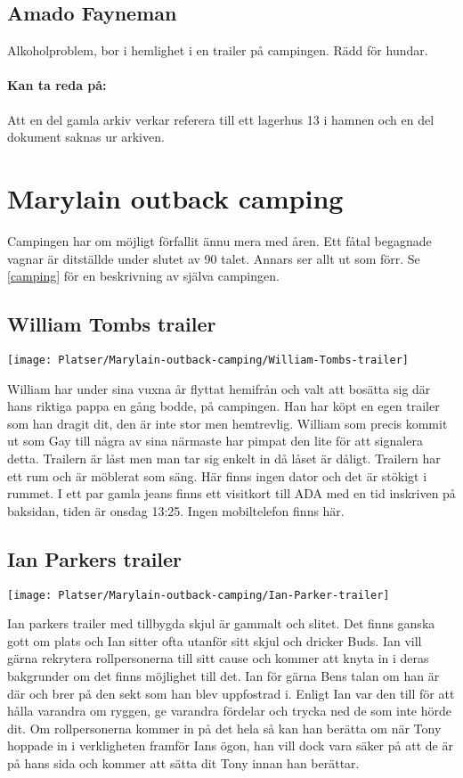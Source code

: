 \documentclass[a5paper,10pt]{report}
\begin{document}
\subsection{Amado Fayneman}
Alkoholproblem, bor i hemlighet i en trailer på campingen. Rädd för hundar.
\paragraph{Kan ta reda på:} Att en del gamla arkiv verkar referera till ett lagerhus 13 i hamnen och en del dokument saknas ur arkiven.
\clearpage
\section{Marylain outback camping}
Campingen har om möjligt förfallit ännu mera med åren. Ett fåtal begagnade vagnar är ditställde under slutet av 90 talet. Annars ser allt ut som förr. Se \ref{camping} för en beskrivning av själva campingen.
\subsection{William Tombs trailer}
\texttt{[image: Platser/Marylain-outback-camping/William-Tombs-trailer]}

William har under sina vuxna år flyttat hemifrån och valt att bosätta sig där hans riktiga pappa en gång bodde, på campingen. Han har köpt en egen trailer som han dragit dit, den är inte stor men hemtrevlig. William som precis kommit ut som Gay till några av sina närmaste har pimpat den lite för att signalera detta. Trailern är låst men man tar sig enkelt in då låset är dåligt. Trailern har ett rum och är möblerat som säng. Här finns ingen dator och det är stökigt i rummet. I ett par gamla jeans finns ett visitkort till ADA med en tid inskriven på baksidan, tiden är onsdag 13:25. Ingen mobiltelefon finns här.
\clearpage
\subsection{Ian Parkers trailer}
\texttt{[image: Platser/Marylain-outback-camping/Ian-Parker-trailer]}

Ian parkers trailer med tillbygda skjul är gammalt och slitet. Det finns ganska gott om plats och Ian sitter ofta utanför sitt skjul och dricker Buds. Ian vill gärna rekrytera rollpersonerna till sitt cause och kommer att knyta in i deras bakgrunder om det finns möjlighet till det. Ian för gärna Bens talan om han är där och brer på den sekt som han blev uppfostrad i. Enligt Ian var den till för att hålla varandra om ryggen, ge varandra fördelar och trycka ned de som inte hörde dit. Om rollpersonerna kommer in på det hela så kan han berätta om när Tony hoppade in i verkligheten framför Ians ögon, han vill dock vara säker på att de är på hans sida och kommer att sätta dit Tony innan han berättar.
\clearpage
\end{document}
